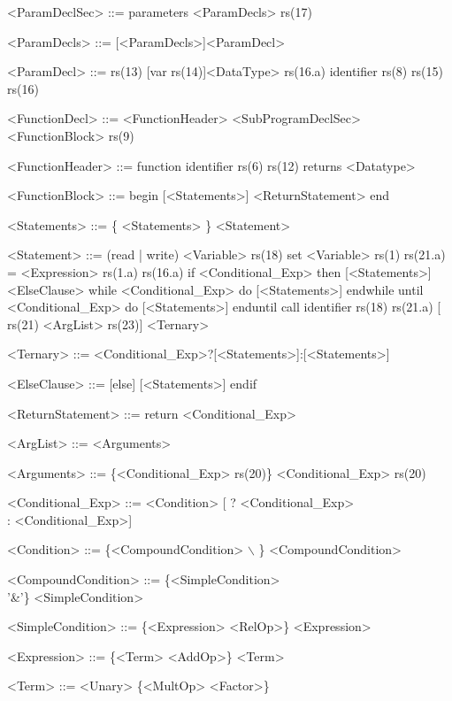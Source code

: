 \documentclass[a4paper,12pt]{article}
\begin{document}
    \begin{rules}
    \begin{numberedgrammar}
      <ParamDeclSec> ::= parameters <ParamDecls> rs(17)

      <ParamDecls> ::= [<ParamDecls>]<ParamDecl>

      <ParamDecl> ::= rs(13) [var rs(14)]<DataType> rs(16.a) identifier rs(8) rs(15) rs(16)\lit{;}

      <FunctionDecl> ::= <FunctionHeader> <SubProgramDeclSec> \\<FunctionBlock> rs(9) \lit{;}

      <FunctionHeader> ::= function identifier rs(6) rs(12) returns <Datatype> \lit{;}

      <FunctionBlock> ::= begin [<Statements>] <ReturnStatement> end

      <Statements> ::= \{ <Statements> \lit{;}\} <Statement>

      <Statement> ::= (read | write) <Variable> rs(18)
      \alt set <Variable> rs(1) rs(21.a) = <Expression> rs(1.a) rs(16.a)
      \alt if <Conditional\_Exp> then [<Statements>] <ElseClause>
      \alt while <Conditional\_Exp> do [<Statements>] endwhile
      \alt until <Conditional\_Exp> do [<Statements>] enduntil
      \alt call identifier rs(18) rs(21.a) [ rs(21) <ArgList> rs(23)]
      \alt <Ternary>

      <Ternary> ::= <Conditional\_Exp>?[<Statements>]:[<Statements>]

      <ElseClause> ::= [else] [<Statements>] endif

      <ReturnStatement> ::= \lit{;} return \lit{(} <Conditional\_Exp> \lit{)}

      <ArgList> ::= \lit{(} <Arguments> \lit{)}

      <Arguments> ::= \{<Conditional\_Exp> rs(20)\lit{,}\} <Conditional\_Exp> rs(20)
	  
      <Conditional\_Exp> ::= <Condition> [ ? <Conditional\_Exp>\\ : <Conditional\_Exp>] 
      
      <Condition> ::= \{<CompoundCondition> $\backslash$ \}    <CompoundCondition>

      <CompoundCondition> ::= \{<SimpleCondition> 
      \\ '\&'\} <SimpleCondition>

      <SimpleCondition> ::= \{<Expression> <RelOp>\} <Expression>

      <Expression> ::= \{<Term> <AddOp>\} <Term>


      <Term> ::= <Unary> \{<MultOp> <Factor>\}
      
    \end{numberedgrammar}\end{rules}
    
\end{document}
